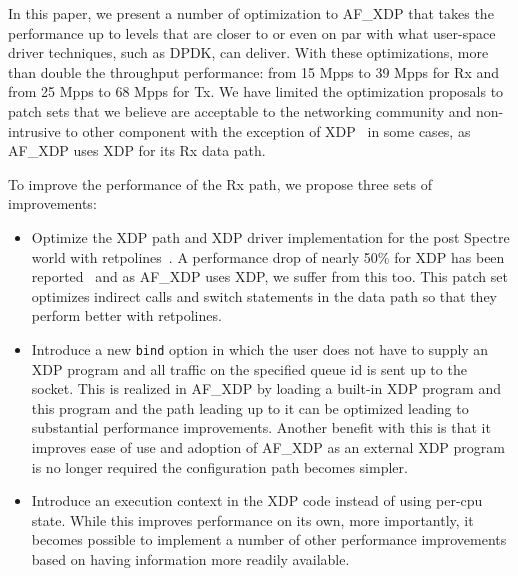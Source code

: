 \documentclass[9pt,numbers,reprint]{sigplanconf}
\begin{document}
In this paper, we present a number of optimization to AF\_XDP that
takes the performance up to levels that are closer to or even on par
with what user-space driver techniques, such as DPDK, can
deliver. With these optimizations, more than double the throughput
performance: from 15 Mpps to 39 Mpps for Rx and from 25 Mpps to 68
Mpps for Tx. We have limited the optimization proposals to patch sets
that we believe are acceptable to the networking community and
non-intrusive to other component with the exception of XDP~\cite{xdp}
in some cases, as AF\_XDP uses XDP for its Rx data path.

To improve the performance of the Rx path, we propose three sets of
improvements:
\begin{itemize}

\item Optimize the XDP path and XDP driver implementation for the post
  Spectre world with retpolines~\cite{retpoline}. A performance drop
  of nearly 50\% for XDP has been reported~\cite{jesper_xdp_perf_drop}
  and as AF\_XDP uses XDP, we suffer from this too. This patch set
  optimizes indirect calls and switch statements in the data path so
  that they perform better with retpolines.

\item Introduce a new {\tt bind} option in which the user does not
  have to supply an XDP program and all traffic on the specified queue
  id is sent up to the socket. This is realized in AF\_XDP by loading
  a built-in XDP program and this program and the path leading up to
  it can be optimized leading to substantial performance
  improvements. Another benefit with this is that it improves ease of
  use and adoption of AF\_XDP as an external XDP program is no longer
  required the configuration path becomes simpler.

\item Introduce an execution context in the XDP code instead of using
  per-cpu state. While this improves performance on its own, more
  importantly, it becomes possible to implement a number of other
  performance improvements based on having information more readily
  available.

\end{itemize}
\end{document}

